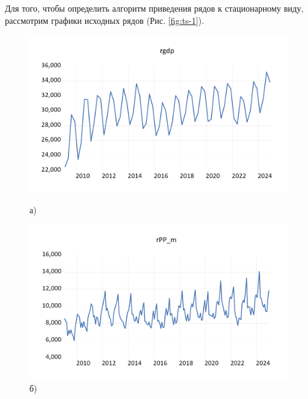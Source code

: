 \documentclass[a4paper, 14pt]{extreport}
\numberwithin{equation}{section}
\numberwithin{equation}{section}
\begin{document}
	Для того, чтобы определить алгоритм приведения рядов к стационарному виду, рассмотрим графики исходных рядов (Рис. \ref{fig:ts-1}).
	
	\begin{figure}[h!]
		\centering
		\begin{minipage}{0.5\textwidth}
			\centering
			\includegraphics[scale=0.4]{images/image05}
			\caption*{а)}
		\end{minipage}%
		\begin{minipage}{0.5\textwidth}
			\centering
			\includegraphics[scale=0.4]{images/image06}
			\caption*{б)}
		\end{minipage}%
		

\end{figure}
\end{document}
